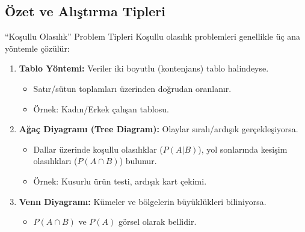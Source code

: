 \documentclass[light]{lutbeamer}
\begin{document}
\subsection{Özet ve Alıştırma Tipleri}
\begin{frame}{``Koşullu Olasılık'' Problem Tipleri}
    Koşullu olasılık problemleri genellikle üç ana yöntemle çözülür:

    \begin{enumerate}
        \item \textbf{Tablo Yöntemi:} Veriler iki boyutlu (kontenjans) tablo halindeyse.
        \begin{itemize}
            \item Satır/sütun toplamları üzerinden doğrudan oranlanır.
            \item Örnek: Kadın/Erkek çalışan tablosu.
        \end{itemize}
        
        \item \textbf{Ağaç Diyagramı (Tree Diagram):} Olaylar sıralı/ardışık gerçekleşiyorsa.
        \begin{itemize}
            \item Dallar üzerinde koşullu olasılıklar ($P(A|B)$), yol sonlarında kesişim olasılıkları ($P(A \cap B)$) bulunur.
            \item Örnek: Kusurlu ürün testi, ardışık kart çekimi.
        \end{itemize}

        \item \textbf{Venn Diyagramı:} Kümeler ve bölgelerin büyüklükleri biliniyorsa.
        \begin{itemize}
            \item $P(A \cap B)$ ve $P(A)$ görsel olarak bellidir.
        \end{itemize}
    \end{enumerate}
\end{frame}
\end{document}
